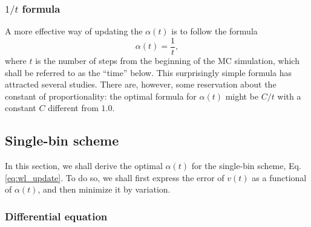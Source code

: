 \documentclass[reprint]{revtex4-1}
\begin{document}
\subsubsection{$1/t$ formula}



A more effective way
of updating the $\alpha(t)$
is to follow the formula
%
\begin{equation}
  \alpha(t) = \frac{1}{t},
  \label{eq:alpha_invt}
\end{equation}
%
where $t$ is the number of steps
from the beginning of the MC simulation,
which shall be referred to as the ``time'' below.
%
This surprisingly simple formula has attracted
several studies\cite{belardinelli2007, belardinelli2007jcp, belardinelli2008,
morozov2007, zhou2008, morozov2009,
komura2012, caparica2012, caparica2014}.
%
There are, however, some reservation about
the constant of proportionality:
the optimal formula for $\alpha(t)$
might be $C/t$ with a constant $C$
different from $1.0$\cite{
morozov2007, zhou2008, morozov2009}.






\subsection{\label{sec:single-bin}
Single-bin scheme}



In this section,
we shall derive the optimal $\alpha(t)$
for the single-bin scheme,
Eq. \eqref{eq:wl_update}.
%
To do so,
we shall first express the error of $v(t)$
as a functional of $\alpha(t)$,
and then minimize it by variation.



\subsubsection{Differential equation}
\end{document}

